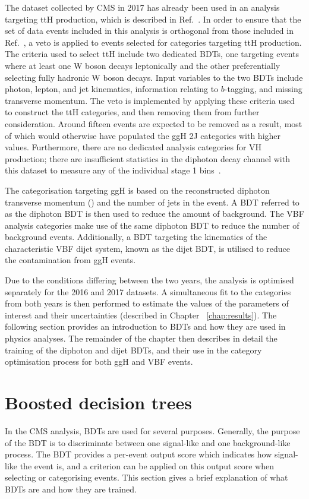 The dataset collected by CMS in 2017 has already been used in an analysis targeting ttH production,
which is described in Ref.~\cite{HIG-18-018}.
In order to ensure that the set of data events included in this analysis is orthogonal 
from those included in Ref.~\cite{HIG-18-018}, 
a veto is applied to events selected for categories targeting ttH production.
The criteria used to select ttH include two dedicated BDTs, 
one targeting events where at least one W boson decays leptonically
and the other preferentially selecting fully hadronic W boson decays.
Input variables to the two BDTs include photon, lepton, and jet kinematics, 
information relating to $b$-tagging, and missing transverse momentum.
The veto is implemented by applying these criteria used to construct the ttH categories, 
and then removing them from further consideration. 
Around fifteen events are expected to be removed as a result, 
most of which would otherwise have populated the ggH 2J categories with higher \ptH values.
Furthermore, there are no dedicated analysis categories for VH production; 
there are insufficient statistics in the diphoton decay channel with this dataset 
to measure any of the individual stage 1 bins~\cite{YR4}.

The categorisation targeting ggH is based on the reconstructed diphoton transverse momentum (\ptgg) 
and the number of jets in the event. 
A BDT referred to as the diphoton BDT is then used to reduce the amount of background. 
The VBF analysis categories make use of the same diphoton BDT 
to reduce the number of background events. 
Additionally, a BDT targeting the kinematics of the characteristic VBF dijet system, 
known as the dijet BDT, is utilised to reduce the contamination from ggH events.

Due to the conditions differing between the two years, 
the analysis is optimised separately for the 2016 and 2017 datasets. 
A simultaneous fit to the categories from both years is then performed to estimate the 
values of the parameters of interest and their uncertainties (described in Chapter ~\ref{chap:results}).
The following section provides an introduction to BDTs and how they are used in physics analyses.
The remainder of the chapter then describes in detail the training of the diphoton and dijet BDTs, 
and their use in the category optimisation process for both ggH and VBF events.

\section{Boosted decision trees}
\label{sec:BDTs}
In the CMS \Hgg analysis, BDTs are used for several purposes.
Generally, the purpose of the BDT is to discriminate between 
one signal-like and one background-like process.
The BDT provides a per-event output score which indicates how signal-like the event is, 
and a criterion can be applied on this output score when selecting or categorising events.
This section gives a brief explanation of what BDTs are and how they are trained.

